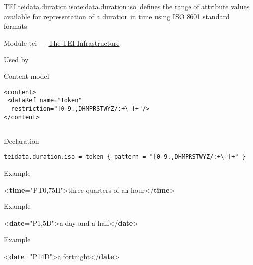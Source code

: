\begin{reflist}
\item[]\begin{specHead}{TEI.teidata.duration.iso}{teidata.duration.iso} defines the range of attribute values available for representation of a duration in time using ISO 8601 standard formats\end{specHead} 
    \item[{Module}]
  tei — \hyperref[ST]{The TEI Infrastructure}
    \item[{Used by}]
  
    \item[{Content model}]
  \mbox{}\hfill\\[-10pt]\begin{Verbatim}[fontsize=\small]
<content>
 <dataRef name="token"
  restriction="[0-9.,DHMPRSTWYZ/:+\-]+"/>
</content>
    
\end{Verbatim}

    \item[{Declaration}]
  \mbox{}\hfill\\[-10pt]\begin{Verbatim}[fontsize=\small]
teidata.duration.iso = token { pattern = "[0-9.,DHMPRSTWYZ/:+\-]+" }
\end{Verbatim}

    \item[{Example}]
  \leavevmode\bgroup{}\exampleFont \begin{shaded}\noindent\mbox{}{<\textbf{time}\hspace*{1em}{dur-iso}="{PT0,75H}">}three-quarters of an hour{</\textbf{time}>}\end{shaded}\egroup 


    \item[{Example}]
  \leavevmode\bgroup{}\exampleFont \begin{shaded}\noindent\mbox{}{<\textbf{date}\hspace*{1em}{dur-iso}="{P1,5D}">}a day and a half{</\textbf{date}>}\end{shaded}\egroup 


    \item[{Example}]
  \leavevmode\bgroup{}\exampleFont \begin{shaded}\noindent\mbox{}{<\textbf{date}\hspace*{1em}{dur-iso}="{P14D}">}a fortnight{</\textbf{date}>}\end{shaded}\egroup 



\end{reflist}
